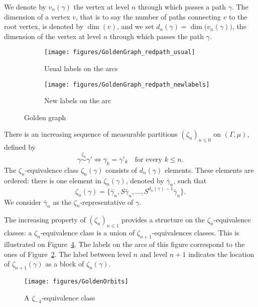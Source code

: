 \documentclass[12pt,a4paper]{article}
\begin{document}
We denote by $v_n(\gamma)$ the vertex at level $n$ through which passes a path $\gamma$. 
The dimension of a vertex $v$, that is to say the number of paths connecting $v$ 
to the root vertex, is denoted by $\dim(v)$, and we set 
$\boxed{d_n(\gamma)=\dim\bigl(v_n(\gamma)\bigr)}$, the dimension of the vertex at level $n$ 
through which passes the path $\gamma$. 


\begin{figure}[!h]
   \centering
   \begin{subfigure}[t]{0.37\textwidth}
   \centering
   	\texttt{[image: figures/GoldenGraph\_redpath\_usual]}
 		\caption{\footnotesize Usual labels on the arcs}\label{fig:GoldenGraph}
    \end{subfigure}              
   \quad
    \begin{subfigure}[t]{0.37\textwidth}
    \centering
   	\texttt{[image: figures/GoldenGraph\_redpath\_newlabels]}
 		\caption{\footnotesize New labels on the arc}\label{fig:GoldenGraph_newlabs}
 	\end{subfigure}      

   \caption{Golden graph}
   \label{fig:ostro}
 \end{figure}

There is an increasing sequence of measurable partitions ${(\zeta_n)}_{n \leq 0}$ 
on $(\Gamma, \mu)$, defined by 
$$
\boxed{\gamma \overset{\zeta_n}{\sim} \gamma' 
\iff \gamma_k=\gamma'_k \quad\text{for every $k \leq n$}}.
$$ 
The $\zeta_n$-equivalence class $\zeta_n(\gamma)$ consists of $d_n(\gamma)$ elements. 
These elements are ordered: there is one element in $\zeta_n(\gamma)$, denoted by 
$\bar\gamma_n$, such that 
$$
\boxed{\zeta_n(\gamma)= \{\bar\gamma_n, S\bar\gamma_n, \ldots, S^{d_n(\gamma)-1}\bar\gamma_n\}}.
$$
We consider $\bar\gamma_n$ as the $\zeta_n$-representative of $\gamma$.



The increasing property of ${(\zeta_n)}_{n \leq 1}$ provides a structure 
on the $\zeta_{n}$-equivalence classes: a $\zeta_n$-equivalence class 
is a union of $\zeta_{n+1}$-equivalences classes. 
This is illustrated on Figure~\ref{fig:GoldenOrbits}. 
The labels on the arcs of this figure correspond to the ones of Figure~\ref{fig:GoldenGraph_newlabs}. 
The label between level $n$ and level $n+1$ indicates the location of 
$\zeta_{n+1}(\gamma)$ as a block of $\zeta_n(\gamma)$. 

\begin{figure}[!h]
\centering
\texttt{[image: figures/GoldenOrbits]}
\caption{A $\zeta_{-4}$-equivalence class}
\label{fig:GoldenOrbits}
\end{figure}
\end{document}
